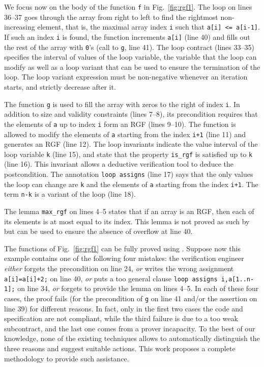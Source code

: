 We focus now on the body of the function \lstinline{f} in
Fig.~\ref{fig:rgf1}. 
The loop on lines 36--37 goes through the array from right
to left to find the rightmost non-increasing element, that is,
the maximal  array index \lstinline{i} such that \lstinline{a[i] <= a[i-1]}.
If such an index \lstinline{i} is found,
the function increments \lstinline{a[i]} (line 40) and fills out the rest
of the array with \lstinline{0}'s (call to \lstinline{g}, line 41).
The loop contract (lines 33--35) specifies the interval of values of the loop variable,
the variable that the loop can modify as well as a loop variant 
that can be used to ensure the termination of the loop.
The loop variant expression must be non-negative whenever an iteration starts,
and strictly decrease after it.

The function \lstinline{g} is used to fill the array with zeros to the right of index \lstinline{i}.
In addition to size and validity constraints (lines 7--8),
its precondition requires that the elements of \lstinline{a} up to index  \lstinline{i}
form an RGF (lines 9--10). 
The function is allowed to modify the elements of \lstinline{a} starting from the index \lstinline{i+1} (line 11)
and generates an RGF (line 12).
The loop invariants 
indicate the value interval of the loop variable \lstinline{k} (line 15), 
and state that the property \lstinline{is_rgf} is satisfied
up to \lstinline{k} (line 16).
This invariant allows a deductive verification tool to deduce the postcondition.
The annotation \lstinline{loop assigns} (line 17) says that the only values the loop can
change are \lstinline{k} and the elements of \lstinline{a} starting from the index \lstinline{i+1}.
The term \lstinline{n-k} is a variant of the loop (line 18).

The \acsl lemma \lstinline'max_rgf' on lines 4--5
states
that if an array is an RGF, then each of its elements is at most equal to its
index.
This lemma is not proved as such by \Wp but can be used to ensure the absence of
overflow at line 40.

The functions of Fig.~\ref{fig:rgf1} can be fully proved using \Wp.
Suppose now this example contains one of the  following four mistakes: 
the verification engineer \emph{either} forgets the precondition on line 24, 
\emph{or} writes the wrong assignment \lstinline[style=c]'a[i]=a[i]+2;' on line 40,
\emph{or} puts a too general clause \lstinline[style=c]'loop assigns i,a[1..n-1];' on line 34,
\emph{or} forgets to provide the lemma  on lines 4--5.
In each of these four cases, the proof  fails (for the precondition of \lstinline{g} on line 41 
and/or the assertion on line 39) for different reasons.
In fact, only in the first two cases the code and specification are not compliant, while
the third failure is due to a too weak subcontract, and the last one comes from a prover incapacity.
To the best of our knowledge, 
none of the existing  techniques allows to automatically
distinguish the three reasons and suggest suitable actions.
This work proposes a complete methodology to provide such assistance.



